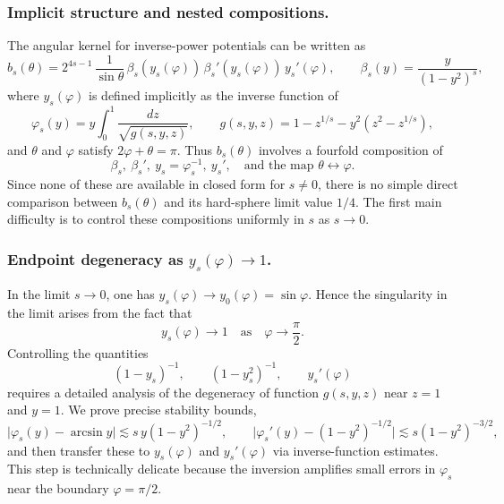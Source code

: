 \documentclass[reqno,10pt]{amsart}
\theoremstyle{definition}
\numberwithin{equation}{section}
\begin{document}
\subsubsection{Implicit structure and nested compositions.}
The angular kernel for inverse-power potentials can be written as
\[
b_s(\theta)
 = 2^{4s-1}\,\frac{1}{\sin\theta}\,
 \beta_s(y_s(\varphi))\,\beta_s'(y_s(\varphi))\,y_s'(\varphi),
\qquad
\beta_s(y)=\frac{y}{(1-y^2)^s},
\]
where $y_s(\varphi)$ is defined implicitly as the inverse function of
\[
\varphi_s(y)
 = y\int_0^1 \frac{dz}{\sqrt{g(s,y,z)}},
\qquad
g(s,y,z)=1 - z^{1/s} - y^2(z^2 - z^{1/s}),
\]
and $\theta$ and $\varphi$ satisfy $2\varphi+\theta=\pi$.
Thus $b_s(\theta)$ involves a fourfold composition of
\[
\beta_s,\ \beta_s',\ y_s=\varphi_s^{-1},\ y_s',
\quad\text{and the map }\theta\leftrightarrow\varphi.
\]
Since none of these are available in closed form for $s\neq0$, there is no simple direct comparison between $b_s(\theta)$ and its hard-sphere limit value $1/4$.  
The first main difficulty is to control these compositions uniformly in $s$ as $s\to0$.

\subsubsection{Endpoint degeneracy as $y_s(\varphi)\to1$.}
In the limit $s\to0$, one has $y_s(\varphi)\to y_0(\varphi)=\sin\varphi$.
Hence the singularity in the limit arises from the fact that
\[
y_s(\varphi)\to 1 \quad \text{as} \quad \varphi\to\frac{\pi}{2}.
\]
Controlling the quantities
\[
(1-y_s)^{-1}, \qquad (1-y_s^2)^{-1}, \qquad y_s'(\varphi)
\]
requires a detailed analysis of the degeneracy of function $g(s,y,z)$ near $z=1$ and $y=1$.  
We prove precise stability bounds,
\[
\bigl|\varphi_s(y)-\arcsin y\bigr|
 \lesssim s\,y(1-y^2)^{-1/2}, 
\qquad
\bigl|\varphi_s'(y)-(1-y^2)^{-1/2}\bigr|
 \lesssim s(1-y^2)^{-3/2},
\]
and then transfer these to $y_s(\varphi)$ and $y_s'(\varphi)$ via inverse-function estimates.
This step is technically delicate because the inversion amplifies small errors in $\varphi_s$ near the boundary $\varphi=\pi/2$.
\end{document}
